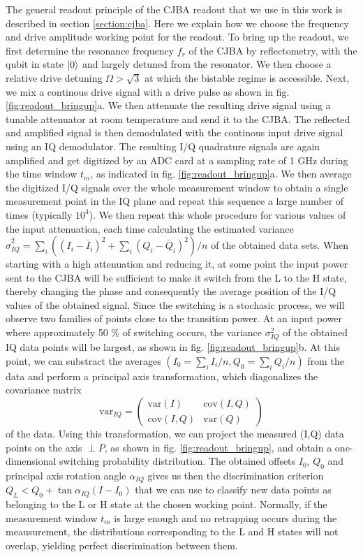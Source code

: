 The general readout principle of the CJBA readout that we use in this work is described in section \ref{section:cjba}. Here we explain how we choose the frequency and drive amplitude working point for the readout. To bring up the readout, we first determine the resonance frequency $f_r$ of the CJBA by reflectometry, with the qubit in state $\left| 0 \right>$ and largely detuned from the resonator. We then choose a relative drive detuning $\Omega>\sqrt{3}$ at which the bistable regime is accessible. Next, we mix a continous drive signal with a drive pulse as shown in fig. \ref{fig:readout_bringup}a. We then attenuate the resulting drive signal using a tunable attenuator at room temperature and send it to the CJBA. The reflected and amplified signal is then demodulated with the continous input drive signal using an IQ demodulator. The resulting I/Q quadrature signals are again amplified and get digitized by an ADC card at a sampling rate of 1 GHz during the time window $t_m$, as indicated in fig. \ref{fig:readout_bringup}a. We then average the digitized I/Q signals over the whole measurement window to obtain a single measurement point in the IQ plane and repeat this sequence a large number of times (typically $10^4$). We then repeat this whole procedure for various values of the input attenuation, each time calculating the estimated variance $\hat{\sigma}_{IQ}^2=\sum\limits_i ((I_i-\bar{I}_i)^2+\sum\limits_i (Q_i-\bar{Q}_i)^2)/n$ of the obtained data sets. When starting with a high attenuation and reducing it, at some point the input power sent to the CJBA will be sufficient to make it switch from the L to the H state, thereby changing the phase and consequently the average position of the I/Q values of the obtained signal. Since the switching is a stochasic process, we will observe two families of points close to the transition power. At an input power where approximately 50 \% of switching occurs, the variance $\sigma_{IQ}^2$ of the obtained IQ data points will be largest, as shown in fig. \ref{fig:readout_bringup}b. At this point, we can substract the averages $(I_0=\sum\limits_i I_i / n,Q_0 = \sum\limits_i Q_i/n)$ from the data and perform a principal axis transformation, which diagonalizes the covariance matrix
%
\begin{equation}
\mathrm{var}_{IQ} = \left(\begin{array}{cc}\mathrm{var}(I) & \mathrm{cov}(I,Q) \\ \mathrm{cov}(I,Q) & \mathrm{var}(Q) \end{array}\right)
\end{equation}
%
of the data. Using this transformation, we can project the measured (I,Q) data points on the axis $\perp P$, as shown in fig. \ref{fig:readout_bringup}, and obtain a one-dimensional switching probability distribution. The obtained offsets $I_0$, $Q_0$ and principal axis rotation angle $\alpha_{IQ}$ gives us then the discrimination criterion $Q_L<Q_0+\tan{\alpha_{IQ}}(I-I_0)$ that we can use to classify new data points as belonging to the L or H state at the chosen working point. Normally, if the measurement window $t_m$ is large enough and no retrapping occurs during the meausurement, the distributions corresponding to the L and H states will not overlap, yielding perfect discrimination between them.

